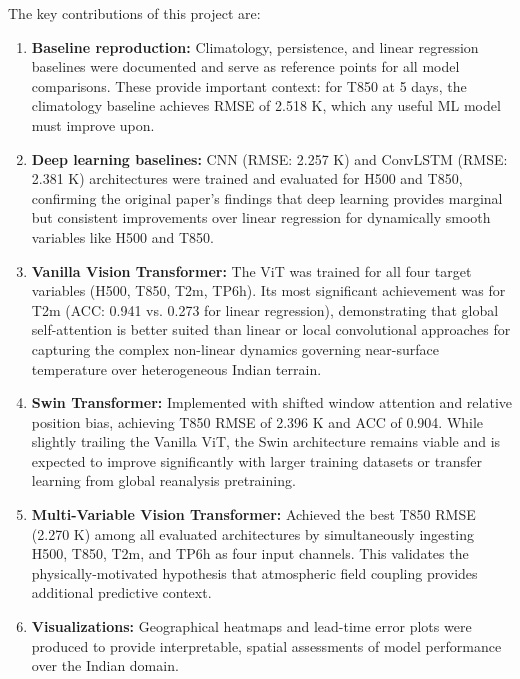 \documentclass[12pt,a4paper,oneside]{report}
\begin{document}
The key contributions of this project are:
\begin{enumerate}
    \item \textbf{Baseline reproduction:} Climatology, persistence, and linear regression baselines were documented and serve as reference points for all model comparisons. These provide important context: for T850 at 5 days, the climatology baseline achieves RMSE of 2.518 K, which any useful ML model must improve upon.
    
    \item \textbf{Deep learning baselines:} CNN (RMSE: 2.257 K) and ConvLSTM (RMSE: 2.381 K) architectures were trained and evaluated for H500 and T850, confirming the original paper's findings that deep learning provides marginal but consistent improvements over linear regression for dynamically smooth variables like H500 and T850.
    
    \item \textbf{Vanilla Vision Transformer:} The ViT was trained for all four target variables (H500, T850, T2m, TP6h). Its most significant achievement was for T2m (ACC: 0.941 vs. 0.273 for linear regression), demonstrating that global self-attention is better suited than linear or local convolutional approaches for capturing the complex non-linear dynamics governing near-surface temperature over heterogeneous Indian terrain.
    
    \item \textbf{Swin Transformer:} Implemented with shifted window attention and relative position bias, achieving T850 RMSE of 2.396 K and ACC of 0.904. While slightly trailing the Vanilla ViT, the Swin architecture remains viable and is expected to improve significantly with larger training datasets or transfer learning from global reanalysis pretraining.
    
    \item \textbf{Multi-Variable Vision Transformer:} Achieved the best T850 RMSE (2.270 K) among all evaluated architectures by simultaneously ingesting H500, T850, T2m, and TP6h as four input channels. This validates the physically-motivated hypothesis that atmospheric field coupling provides additional predictive context.
    
    \item \textbf{Visualizations:} Geographical heatmaps and lead-time error plots were produced to provide interpretable, spatial assessments of model performance over the Indian domain.
\end{enumerate}
\end{document}
